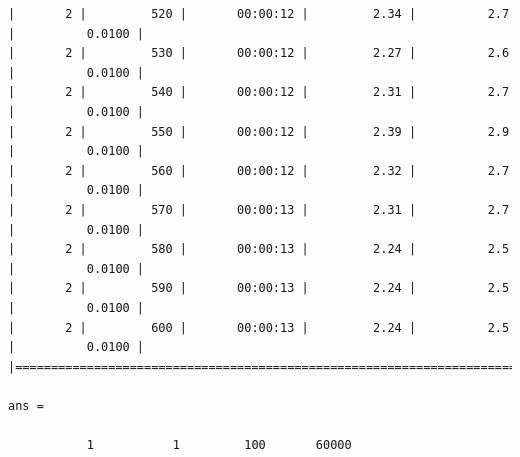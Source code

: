 \documentclass[11pt]{article}
\begin{document}
\begin{Verbatim}[commandchars=\\\{\}]
|       2 |         520 |       00:00:12 |         2.34 |          2.7 |          0.0100 |
|       2 |         530 |       00:00:12 |         2.27 |          2.6 |          0.0100 |
|       2 |         540 |       00:00:12 |         2.31 |          2.7 |          0.0100 |
|       2 |         550 |       00:00:12 |         2.39 |          2.9 |          0.0100 |
|       2 |         560 |       00:00:12 |         2.32 |          2.7 |          0.0100 |
|       2 |         570 |       00:00:13 |         2.31 |          2.7 |          0.0100 |
|       2 |         580 |       00:00:13 |         2.24 |          2.5 |          0.0100 |
|       2 |         590 |       00:00:13 |         2.24 |          2.5 |          0.0100 |
|       2 |         600 |       00:00:13 |         2.24 |          2.5 |          0.0100 |
|========================================================================================|

ans =

           1           1         100       60000


\end{Verbatim}
\end{document}
